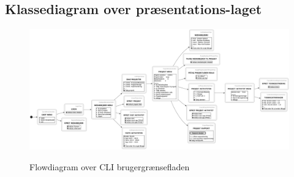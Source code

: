 \begin{landscape}
    \section{Klassediagram over præsentations-laget}\label{apdx:classDiagram_presentation}
    \begin{figure}[H]
        \centering
        \caption{Flowdiagram over CLI brugergrænsefladen}
        \includegraphics[width = \linewidth, keepaspectratio]{TaskFusion/out/assets/diagrams/flow_cli/flow_cli.png}
        \label{fig:flow_cli_big}
    \end{figure}
\end{landscape}